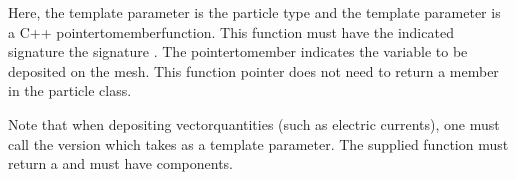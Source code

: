 \documentclass[letterpaper,10pt,english]{sphinxmanual}
\begin{document}
\begin{sphinxVerbatim}[commandchars=\\\{\},formatcom=\scriptsize]
     
               
                                 
                          
                        
                               
                         
                                         
\end{sphinxVerbatim}

\sphinxAtStartPar
Here, the template parameter  is the particle type and the template parameter  is a C++ pointer\sphinxhyphen{}to\sphinxhyphen{}member\sphinxhyphen{}function.
This function must have the indicated signature   the signature .
The pointer\sphinxhyphen{}to\sphinxhyphen{}member  indicates the variable to be deposited on the mesh.
This function pointer does not need to return a member in the particle class.

\sphinxAtStartPar
Note that when depositing vector\sphinxhyphen{}quantities (such as electric currents), one must call the version which takes  as a template parameter.
The supplied function must return a  and  must have  components.
\end{document}
